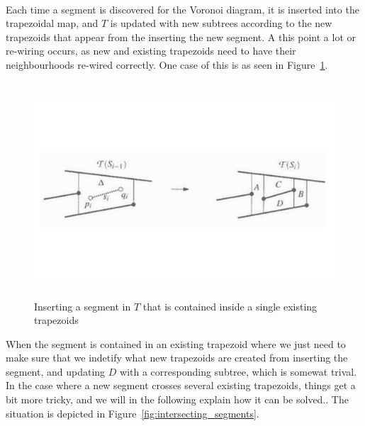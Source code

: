 \paragraph{}
Each time a segment is discovered for the Voronoi diagram, it is inserted into the trapezoidal map, and $T$ is updated with new subtrees according to the new trapezoids that appear from the inserting the new segment. A this point a lot or re-wiring occurs, as new and existing trapezoids need to have their neighbourhoods re-wired correctly. One case of this is as seen in Figure~\ref{fig:contained_segment}. 

\begin{figure}[t]
    \centering
      \includegraphics[height=80mm]{images/contained_segment.pdf}
    \caption{Inserting a segment in $T$ that is contained inside a single existing trapezoids}
    \label{fig:contained_segment}
\end{figure}

When the segment is contained in an existing trapezoid where we just need to make sure that we indetify what new trapezoids are created from inserting the segment, and updating $D$ with a corresponding subtree, which is somewat trival. In the case where a new segment crosses several existing trapezoids, things get a bit more tricky, and we will in the following explain how it can be solved.. The situation is depicted in Figure~\ref{fig:intersecting_segments}.\paragraph{}

